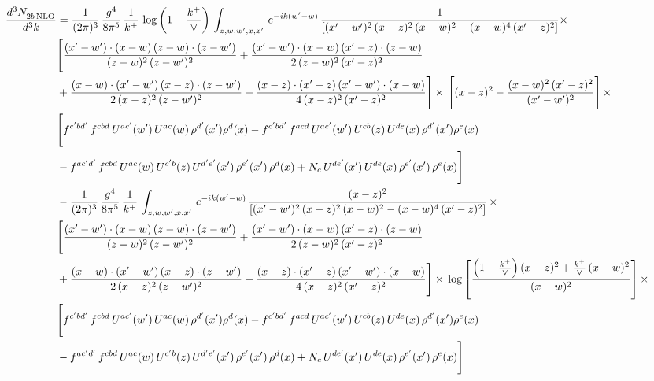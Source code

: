 \documentclass[9pt]{article}
\numberwithin{equation}{section}
\begin{document}
\begin{align}
    \frac{d^{3}N_{2b\,\rm NLO}^{\rm}}{d^{3}k}  & =  \frac{1}{(2\pi)^{3}}\, \frac{g^{4}}{8\pi^{5}}\,\frac{1}{k^{+}}\,\log{\left(1-\frac{k^{+}}{\vee}\right)}\,\int_{z,w,w^{\prime},x,x'}\, e^{-ik(w^{\prime}-w)}\, \frac{1}{\left[(x'-w')^{2}\,(x-z)^{2}\,(x-w)^{2} - (x-w)^{4}\, (x'-z)^{2}\right]} \times\notag \\ & \Bigg[\frac{(x'-w')\cdot (x-w)\, (z-w)\cdot (z-w')}{(z-w)^{2}\, (z-w')^{2}}+\frac{(x'-w')\cdot (x-w)\, (x'-z)\cdot (z-w)}{2\, (z-w)^{2}\, (x'-z)^{2}}\notag \\ & +\frac{(x-w)\cdot (x'-w')\, (x-z)\cdot (z-w')}{2\, (x-z)^{2}\, (z-w')^{2}}+\frac{(x-z)\cdot (x'-z)\, (x'-w')\cdot (x-w)}{4\, (x-z)^{2}\, (x'-z)^{2}}\Bigg] \times\,\Bigg[(x-z)^{2} - \frac{(x-w)^{2}\, (x'-z)^{2}}{(x'-w')^{2}}\Bigg]\,\times \notag \\ & \Bigg[f^{c'bd'}\,f^{cbd}\, U^{ac'}(w')\,U^{ac}(w)\,\rho^{d'}(x')\rho^{d}(x)- f^{c'bd'}\,f^{acd}\,U^{ac'}(w')\,U^{cb}(z)\,U^{de}(x)\,\rho^{d'}(x')\rho^{e}(x) \notag \\ & -f^{ac'd'}\,f^{cbd}\,U^{ac}(w)\,U^{c'b}(z)\,U^{d'e'}(x')\,\rho^{e'}(x')\,\rho^{d}(x) +N_{c}\,U^{de'}(x')\,U^{de}(x)\,\rho^{e'}(x')\,\rho^{e}(x)\Bigg] \notag \\
&  - \frac{1}{(2\pi)^{3}}\, \frac{g^{4}}{8\pi^{5}}\,\frac{1}{k^{+}}\,\int_{z,w,w^{\prime},x,x'}\, e^{-ik(w^{\prime}-w)}\, \frac{(x-z)^{2}}{\left[(x'-w')^{2}\,(x-z)^{2}\,(x-w)^{2} - (x-w)^{4}\, (x'-z)^{2}\right]}\,  \times\notag \\ & \Bigg[\frac{(x'-w')\cdot (x-w)\, (z-w)\cdot (z-w')}{(z-w)^{2}\, (z-w')^{2}}+\frac{(x'-w')\cdot (x-w)\, (x'-z)\cdot (z-w)}{2\, (z-w)^{2}\, (x'-z)^{2}}\notag \\ & +\frac{(x-w)\cdot (x'-w')\, (x-z)\cdot (z-w')}{2\, (x-z)^{2}\, (z-w')^{2}}+\frac{(x-z)\cdot (x'-z)\, (x'-w')\cdot (x-w)}{4\, (x-z)^{2}\, (x'-z)^{2}}\Bigg] \times\,\log{\left[\frac{\left(1-\frac{k^{+}}{\vee}\right)(x-z)^{2}+\frac{k^{+}}{\vee}\,(x-w)^{2}}{(x-w)^{2}}\right]}\,\times \notag \\ & \Bigg[f^{c'bd'}\,f^{cbd}\, U^{ac'}(w')\,U^{ac}(w)\,\rho^{d'}(x')\rho^{d}(x)- f^{c'bd'}\,f^{acd}\,U^{ac'}(w')\,U^{cb}(z)\,U^{de}(x)\,\rho^{d'}(x')\rho^{e}(x) \notag \\ & -f^{ac'd'}\,f^{cbd}\,U^{ac}(w)\,U^{c'b}(z)\,U^{d'e'}(x')\,\rho^{e'}(x')\,\rho^{d}(x) +N_{c}\,U^{de'}(x')\,U^{de}(x)\,\rho^{e'}(x')\,\rho^{e}(x)\Bigg] \notag \\

\end{align}
\end{document}
